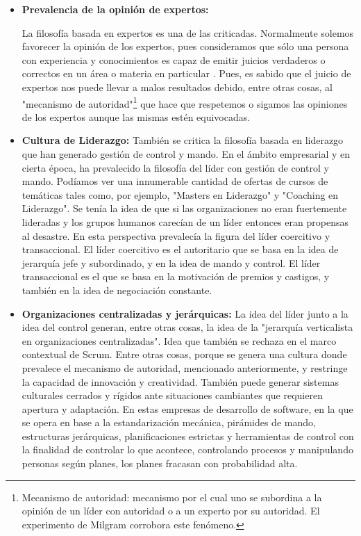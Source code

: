 \begin{itemize}

\item \textbf{Prevalencia de la opinión de expertos: }

La filosofía basada en expertos es una de las criticadas. Normalmente solemos favorecer la opinión de los expertos, pues consideramos que sólo una persona con experiencia y conocimientos es capaz de emitir juicios verdaderos o correctos en un área o materia en particular \cite{James-Surowiecki-2005}. Pues, es sabido que el juicio de expertos nos puede llevar a malos resultados debido, entre otras cosas, al "mecanismo de autoridad"\footnote{Mecanismo de autoridad: mecanismo por el cual uno se subordina a la opinión de un líder con autoridad o a un experto por su autoridad. El experimento de Milgram corrobora este fenómeno.} que hace que respetemos o sigamos las opiniones de los expertos aunque las mismas estén equivocadas.

\item \textbf{Cultura de Liderazgo: }
También se critica la filosofía basada en liderazgo que han generado gestión de control y mando. En el ámbito empresarial y en cierta época, ha prevalecido la filosofía del líder con gestión de control y mando. Podíamos ver una innumerable cantidad de ofertas de cursos de temáticas tales como, por ejemplo, "Masters en Liderazgo" y "Coaching en Liderazgo". Se tenía la idea de que si las organizaciones no eran fuertemente lideradas y los grupos humanos carecían de un líder entonces eran propensas al desastre. En esta perspectiva prevalecía la figura del líder coercitivo y transaccional. El líder coercitivo es el autoritario que se basa en la idea de jerarquía jefe y subordinado, y en la idea de mando y control. El líder transaccional es el que se basa en la motivación de premios y castigos, y también en la idea de negociación constante.

\item \textbf{Organizaciones centralizadas y jerárquicas: }
La idea del líder junto a la idea del control generan, entre otras cosas, la idea de la "jerarquía verticalista en organizaciones centralizadas". Idea que también se rechaza en el marco contextual de Scrum. Entre otras cosas, porque se genera una cultura donde prevalece el mecanismo de autoridad, mencionado anteriormente, y restringe la capacidad de innovación y creatividad. También puede generar sistemas culturales cerrados y rígidos ante situaciones cambiantes que requieren apertura y adaptación. En estas empresas de desarrollo de software, en la que se opera en base a la estandarización mecánica, pirámides de mando, estructuras jerárquicas, planificaciones estrictas y herramientas de control con la finalidad de controlar lo que acontece, controlando procesos y manipulando personas según planes, los planes fracasan con probabilidad alta.


\end{itemize}
